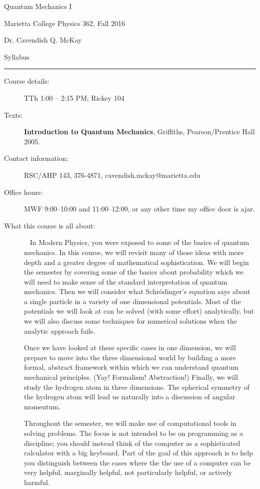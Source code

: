 \documentclass{article}
\begin{document}
\centerline{\Large Quantum Mechanics I}
\vskip0.1cm\centerline{\large Marietta College Physics 362, Fall 2016}
\vskip0.1cm\centerline{Dr. Cavendish Q. McKay}
\vskip 0.25cm
\centerline{Syllabus}
\vskip0.1cm\hrule\vskip0.5cm
\begin{description}
\item[Course details:] TTh 1:00 -- 2:15 PM; Rickey 104
\item[Texts:] {\bf Introduction to Quantum Mechanics},
  Griffiths, Pearson/Prentice Hall 2005.
\item[Contact information:] RSC/AHP 143, 376-4871,
  cavendish.mckay@marietta.edu
\item[Office hours:] MWF 9:00--10:00 and 11:00--12:00, or any other time my office
  door is ajar.

\item[What this course is all about:] {\ } \newline In Modern Physics,
  you were exposed to some of the basics of quantum mechanics.  In
  this course, we will revisit many of those ideas with more depth and
  a greater degree of mathematical sophistication. We will begin the
  semester by covering some of the basics about probability which we
  will need to make sense of the standard interpretation of quantum
  mechanics.  Then we will consider what Schr\"odinger's equation
  says about a single particle in a variety of one dimensional
  potentials. Most of the potentials we will look at can be solved
  (with some effort) analytically, but we will also discuss some
  techniques for numerical solutions when the analytic approach fails.

  Once we have looked at these specific cases in one dimension, we
  will prepare to move into the three dimensional world by building a
  more formal, abstract framework within which we can understand
  quantum mechanical principles. (Yay! Formalism! Abstraction!)
  Finally, we will study the hydrogen atom in three dimensions.  The
  spherical symmetry of the hydrogen atom will lead us naturally into
  a discussion of angular momentum.

  Throughout the semester, we will make use of computational tools in
  solving problems. The focus is not intended to be on programming as
  a discipline; you should instead think of the computer as a
  sophisticated calculator with a big keyboard. Part of the goal of
  this approach is to help you distinguish between the cases where the
  the use of a computer can be very helpful, marginally helpful, not
  particularly helpful, or actively harmful.
  

\end{description}
\end{document}
